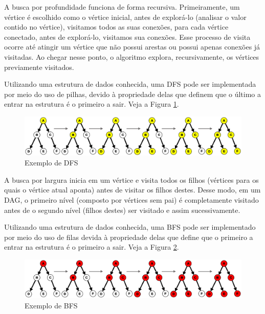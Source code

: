       A busca por profundidade funciona de forma recursiva. Primeiramente, um vértice é escolhido como o vértice inicial, antes de explorá-lo (analisar o valor contido no vértice), visitamos todos as suas conexões, para cada vértice conectado, antes de explorá-lo, visitamos sua conexões. Esse processo de visita ocorre até atingir um vértice que não possui arestas ou possui apenas conexões já visitadas. Ao chegar nesse ponto, o algoritmo explora, recursivamente, os vértices previamente visitados.

      Utilizando uma estrutura de dados conhecida, uma DFS pode ser implementada por meio do uso de pilhas, devido à propriedade delas que definem que o último a entrar na estrutura é o primeiro a sair. Veja a Figura \ref{dfs}.

      \begin{figure}[htb]
        \centering
        \includegraphics[scale=0.2]{figuras/dfs.eps}
        \caption{Exemplo de DFS}
        \label{dfs}
      \end{figure}


      A busca por largura inicia em um vértice e visita todos os filhos (vértices para os quais o vértice atual aponta) antes de visitar os filhos destes. Desse modo, em um DAG, o primeiro nível (composto por vértices sem pai) é completamente visitado antes de o segundo nível (filhos destes) ser visitado e assim sucessivamente.

      Utilizando uma estrutura de dados conhecida, uma BFS pode ser implementado por meio do uso de filas devida à propriedade delas que define que o primeiro a entrar na estrutura é o primeiro a sair. Veja a Figura \ref{bfs}.

      \begin{figure}[htb]
        \centering
        \includegraphics[scale=0.2]{figuras/bfs.eps}
        \caption{Exemplo de BFS}
        \label{bfs}
      \end{figure}

